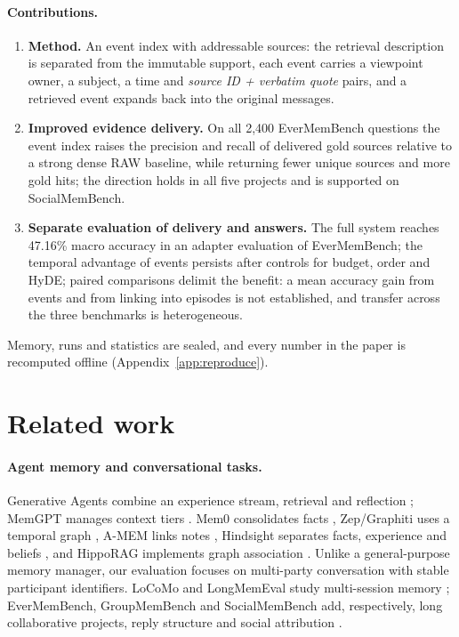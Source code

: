 \documentclass[11pt,a4paper]{article}
\begin{document}
\paragraph{Contributions.}
\begin{enumerate}
\item \textbf{Method.} An event index with addressable sources: the retrieval
description is separated from the immutable support, each event carries a
viewpoint owner, a subject, a time and \emph{source ID + verbatim quote} pairs, and
a retrieved event expands back into the original messages.
\item \textbf{Improved evidence delivery.} On all 2,400 EverMemBench questions the
event index raises the precision and recall of delivered gold sources relative to
a strong dense RAW baseline, while returning fewer unique sources and more gold
hits; the direction holds in all five projects and is supported on SocialMemBench.
\item \textbf{Separate evaluation of delivery and answers.} The full system reaches
47.16\% macro accuracy in an adapter evaluation of EverMemBench; the temporal
advantage of events persists after controls for budget, order and HyDE; paired
comparisons delimit the benefit: a mean accuracy gain from events and from linking
into episodes is not established, and transfer across the three benchmarks is
heterogeneous.
\end{enumerate}
Memory, runs and statistics are sealed, and every number in the paper is
recomputed offline (Appendix~\ref{app:reproduce}).

\section{Related work}

\paragraph{Agent memory and conversational tasks.}
Generative Agents combine an experience stream, retrieval and reflection
\citep{park2023}; MemGPT manages context tiers \citep{packer2023}. Mem0
consolidates facts \citep{chhikara2025mem0}, Zep/Graphiti uses a temporal graph
\citep{rasmussen2025zep}, A-MEM links notes \citep{xu2025amem}, Hindsight separates
facts, experience and beliefs \citep{latimer2025hindsight}, and HippoRAG implements
graph association \citep{gutierrez2024hipporag}. Unlike a general-purpose memory
manager, our evaluation focuses on multi-party conversation with stable
participant identifiers. LoCoMo and LongMemEval study multi-session memory
\citep{maharana2024,wu2024}; EverMemBench, GroupMemBench and SocialMemBench add,
respectively, long collaborative projects, reply structure and social attribution
\citep{hu2026,yang2026,owolabi2026}.
\end{document}
